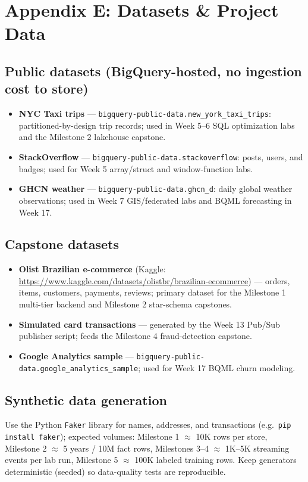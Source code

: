 \documentclass[11pt, a4paper]{article}
\begin{document}
\newpage
\section{Appendix E: Datasets \& Project Data}

\subsection*{Public datasets (BigQuery-hosted, no ingestion cost to store)}
\begin{itemize}[label=-]
    \item \textbf{NYC Taxi trips} --- \texttt{bigquery-public-data.new\_york\_taxi\_trips}: partitioned-by-design trip records; used in Week 5--6 SQL optimization labs and the Milestone 2 lakehouse capstone.
    \item \textbf{StackOverflow} --- \texttt{bigquery-public-data.stackoverflow}: posts, users, and badges; used for Week 5 array/struct and window-function labs.
    \item \textbf{GHCN weather} --- \texttt{bigquery-public-data.ghcn\_d}: daily global weather observations; used in Week 7 GIS/federated labs and BQML forecasting in Week 17.
\end{itemize}

\subsection*{Capstone datasets}
\begin{itemize}[label=-]
    \item \textbf{Olist Brazilian e-commerce} (Kaggle: \url{https://www.kaggle.com/datasets/olistbr/brazilian-ecommerce}) --- orders, items, customers, payments, reviews; primary dataset for the Milestone 1 multi-tier backend and Milestone 2 star-schema capstones.
    \item \textbf{Simulated card transactions} --- generated by the Week 13 Pub/Sub publisher script; feeds the Milestone 4 fraud-detection capstone.
    \item \textbf{Google Analytics sample} --- \texttt{bigquery-public-data.google\_analytics\_sample}; used for Week 17 BQML churn modeling.
\end{itemize}

\subsection*{Synthetic data generation}
Use the Python \texttt{Faker} library for names, addresses, and transactions (e.g.\ \texttt{pip install faker}); expected volumes: Milestone 1 $\approx$ 10K rows per store, Milestone 2 $\approx$ 5 years / 10M fact rows, Milestones 3--4 $\approx$ 1K--5K streaming events per lab run, Milestone 5 $\approx$ 100K labeled training rows. Keep generators deterministic (seeded) so data-quality tests are reproducible.
\end{document}
